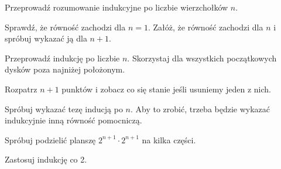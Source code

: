 \newpage
{}

\begin{hints_list}
	\item Przeprowadź rozumowanie indukcyjne po liczbie wierzchołków $n$.

	\item Sprawdź, że równość zachodzi dla $n = 1$. Załóż, że równość zachodzi dla $n$ i spróbuj wykazać ją dla $n + 1$.

	\item
	Przeprowadź indukcję po liczbie $n$. Skorzystaj dla wszystkich początkowych dysków poza najniżej położonym.

	\item Rozpatrz $n + 1$ punktów i zobacz co się stanie jeśli usuniemy jeden z nich.

	\item Spróbuj wykazać tezę inducją po $n$. Aby to zrobić, trzeba będzie wykazać indukcyjnie inną równość pomocniczą.

	\item Spróbuj podzielić planszę $2^{n + 1} \cdot 2^{n + 1}$ na kilka części.

	\item Zastosuj indukcję co 2.
\end{hints_list}